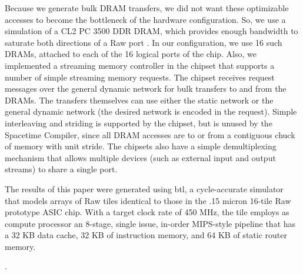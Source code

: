 Because we generate bulk DRAM transfers, we did not want these
optimizable accesses to become the bottleneck of the hardware
configuration.  So, we use a simulation of a CL2 PC 3500 DDR DRAM,
which provides enough bandwidth to saturate both directions of a Raw
port \cite{raw_isca}.  In our configuration, we use 16 such DRAMs,
attached to each of the 16 logical ports of the chip.  Also, we
implemented a streaming memory controller in the chipset that supports
a number of simple streaming memory requests.  The chipset receives
request messages over the general dynamic network for bulk transfers
to and from the DRAMs.  The transfers themselves can use either the
static network or the general dynamic network (the desired network is
encoded in the request).  Simple interleaving and striding is
supported by the chipset, but is unused by the Spacetime Compiler,
since all DRAM accesses are to or from a contiguous chuck of memory
with unit stride. The chipsets also have a simple demultiplexing
mechanism that allows multiple devices (such as external input and
output streams) to share a single port.

The results of this paper were generated using btl, a cycle-accurate
simulator that models arrays of Raw tiles identical to those in the
.15 micron 16-tile Raw prototype ASIC chip.  With a target clock rate
of 450 MHz, the tile employs as compute processor an 8-stage, single
issue, in-order MIPS-style pipeline that has a 32 KB data cache, 32 KB
of instruction memory, and 64 KB of static router memory.

.